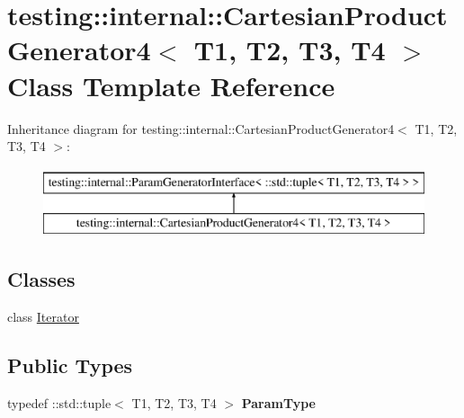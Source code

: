 \hypertarget{classtesting_1_1internal_1_1_cartesian_product_generator4}{}\section{testing\+:\+:internal\+:\+:Cartesian\+Product\+Generator4$<$ T1, T2, T3, T4 $>$ Class Template Reference}
\label{classtesting_1_1internal_1_1_cartesian_product_generator4}
Inheritance diagram for testing\+:\+:internal\+:\+:Cartesian\+Product\+Generator4$<$ T1, T2, T3, T4 $>$\+:\begin{figure}[H]
\begin{center}
\leavevmode
\includegraphics[height=2.000000cm]{classtesting_1_1internal_1_1_cartesian_product_generator4}
\end{center}
\end{figure}
\subsection*{Classes}
\begin{DoxyCompactItemize}
\item 
class \mbox{\hyperlink{classtesting_1_1internal_1_1_cartesian_product_generator4_1_1_iterator}{Iterator}}
\end{DoxyCompactItemize}
\subsection*{Public Types}
\begin{DoxyCompactItemize}
\item 
\mbox{\label{classtesting_1_1internal_1_1_cartesian_product_generator4_ab5e2480f7abacb80850de470c3225412}} 
typedef \+::std\+::tuple$<$ T1, T2, T3, T4 $>$ {\bfseries Param\+Type}
\end{DoxyCompactItemize}
